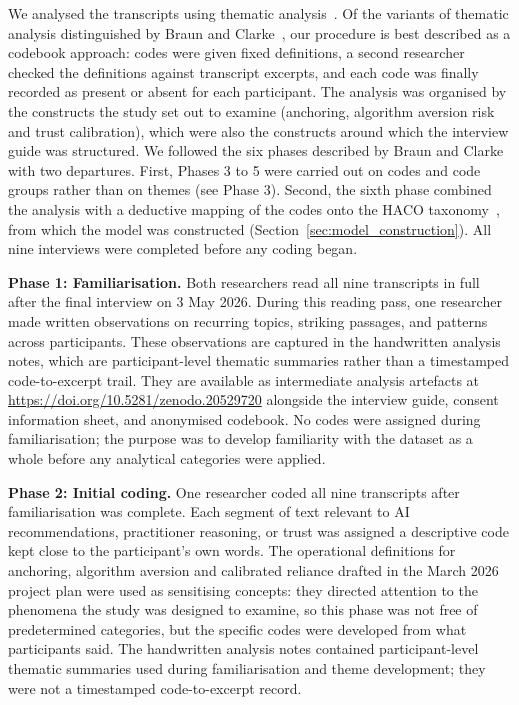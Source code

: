 \documentclass[a4paper,twoside]{bth}
\begin{document}
We analysed the transcripts using thematic analysis~\cite{braun2006using}. Of the variants of thematic analysis distinguished by Braun and Clarke~\cite{braun2021one}, our procedure is best described as a codebook approach: codes were given fixed definitions, a second researcher checked the definitions against transcript excerpts, and each code was finally recorded as present or absent for each participant. The analysis was organised by the constructs the study set out to examine (anchoring, algorithm aversion risk and trust calibration), which were also the constructs around which the interview guide was structured. We followed the six phases described by Braun and Clarke~\cite{braun2006using} with two departures. First, Phases 3 to 5 were carried out on codes and code groups rather than on themes (see Phase 3). Second, the sixth phase combined the analysis with a deductive mapping of the codes onto the HACO taxonomy~\cite{dubey2020haco}, from which the model was constructed (Section~\ref{sec:model_construction}). All nine interviews were completed before any coding began.

\textbf{Phase 1: Familiarisation.} Both researchers read all nine transcripts in full after the final interview on 3 May 2026. During this reading pass, one researcher made written observations on recurring topics, striking passages, and patterns across participants. These observations are captured in the handwritten analysis notes, which are participant-level thematic summaries rather than a timestamped code-to-excerpt trail. They are available as intermediate analysis artefacts at \url{https://doi.org/10.5281/zenodo.20529720} alongside the interview guide, consent information sheet, and anonymised codebook. No codes were assigned during familiarisation; the purpose was to develop familiarity with the dataset as a whole before any analytical categories were applied.

\textbf{Phase 2: Initial coding.} One researcher coded all nine transcripts after familiarisation was complete. Each segment of text relevant to AI recommendations, practitioner reasoning, or trust was assigned a descriptive code kept close to the participant's own words. The operational definitions for anchoring, algorithm aversion and calibrated reliance drafted in the March 2026 project plan were used as sensitising concepts: they directed attention to the phenomena the study was designed to examine, so this phase was not free of predetermined categories, but the specific codes were developed from what participants said. The handwritten analysis notes contained participant-level thematic summaries used during familiarisation and theme development; they were not a timestamped code-to-excerpt record.
\end{document}
